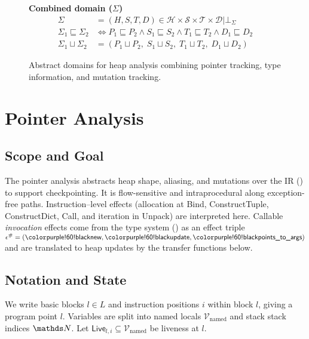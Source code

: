 \begin{figure*}[t]
\vspace{1.5em}

\noindent\textbf{Combined domain ($\Sigma$)}
\begin{align*}
\Sigma &= (H,S,T,D) \in \mathcal{H} \times \mathcal{S} \times \mathcal{T} \times \mathcal{D} | \bot_\Sigma\\[0.3em]
\Sigma_1 \sqsubseteq \Sigma_2 &\iff P_1 \sqsubseteq P_2 \land S_1 \sqsubseteq S_2 \land T_1 \sqsubseteq T_2 \land D_1 \sqsubseteq D_2 \\[0.3em]
\Sigma_1 \sqcup \Sigma_2 &= (P_1 \sqcup P_2,\; S_1 \sqcup S_2,\; T_1 \sqcup T_2,\; D_1 \sqcup D_2)
\end{align*}

\caption{Abstract domains for heap analysis combining pointer tracking, type information, and mutation tracking.}
\label{fig:abstract-domains}
\end{figure*}

\newpage
\section{Pointer Analysis}
\label{sec:appendix-pointer}

\subsection{Scope and Goal}

The pointer analysis abstracts heap shape, aliasing, and mutations over the \spytecode IR
() to support checkpointing. It is
flow-sensitive and intraprocedural along exception-free paths.
Instruction–level effects (allocation at \textsf{Bind}, \textsf{ConstructTuple},
\textsf{ConstructDict}, \textsf{Call}, and iteration in \textsf{Unpack}) are interpreted here.
Callable \emph{invocation} effects come from the type system
() as an effect triple
\(\epsilon^\#=(\tnew,\tupdate,\tptstoargs)\) and are translated to
heap updates by the transfer functions below.

\subsection{Notation and State}

We write basic blocks \(l\in L\) and instruction positions \(i\) within block \(l\), giving a program point \(l\).
Variables are split into named locals \(\mathcal{V}_{\mathrm{named}}\) and stack stack indices $\tN$.
Let \(\mathsf{Live}_{l,i}\subseteq \mathcal{V}_{\mathrm{named}}\) be liveness at \(l\).

